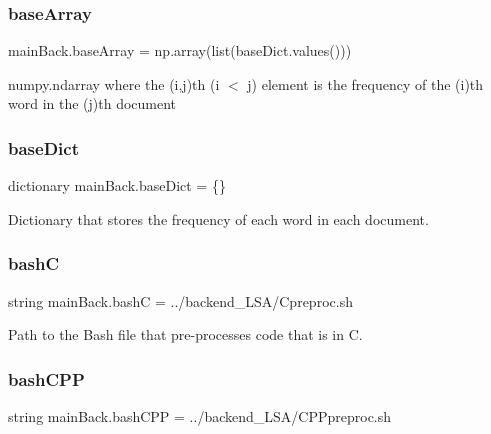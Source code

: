 \subsubsection{\texorpdfstring{base\+Array}{baseArray}}
{\footnotesize\ttfamily main\+Back.\+base\+Array = np.\+array(list(base\+Dict.\+values()))}



numpy.\+ndarray where the (i,j)th (i $<$ j) element is the frequency of the (i)th word in the (j)th document 

\mbox{\label{namespacemain_back_a522d29412adaea9af5a5f622a084f3d7}} 
\subsubsection{\texorpdfstring{base\+Dict}{baseDict}}
{\footnotesize\ttfamily dictionary main\+Back.\+base\+Dict = \{\}}



Dictionary that stores the frequency of each word in each document. 

\mbox{\label{namespacemain_back_a0b5af764dbf53bd6ff0203d136bba033}} 
\subsubsection{\texorpdfstring{bashC}{bashC}}
{\footnotesize\ttfamily string main\+Back.\+bashC = \textquotesingle{}../backend\+\_\+\+L\+SA/Cpreproc.\+sh\textquotesingle{}}



Path to the Bash file that pre-\/processes code that is in C. 

\mbox{\label{namespacemain_back_a926b9a8bc31c40a32db4d060aeb2a6ef}} 
\subsubsection{\texorpdfstring{bash\+C\+PP}{bashCPP}}
{\footnotesize\ttfamily string main\+Back.\+bash\+C\+PP = \textquotesingle{}../backend\+\_\+\+L\+SA/C\+P\+Ppreproc.\+sh\textquotesingle{}}



